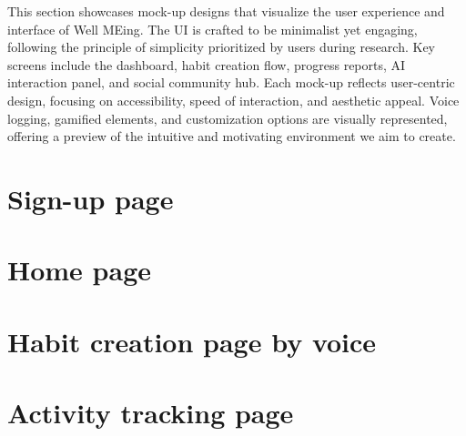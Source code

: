 This section showcases mock-up designs that visualize the user experience and interface of Well MEing. 
The UI is crafted to be minimalist yet engaging, following the principle of simplicity prioritized by users during research. 
Key screens include the dashboard, habit creation flow, progress reports, AI interaction panel, and social community hub. 
Each mock-up reflects user-centric design, focusing on accessibility, speed of interaction, and aesthetic appeal. Voice logging, gamified elements, and customization options are visually represented, offering a preview of the intuitive and motivating environment we aim to create.

\section{Sign-up page}
\section{Home page}
\section{Habit creation page by voice}
\section{Activity tracking page}